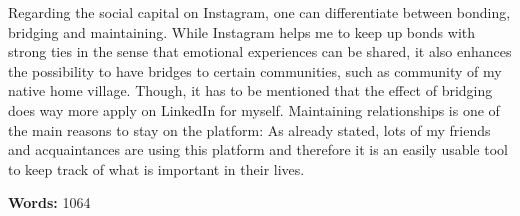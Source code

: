 \documentclass[11pt,letterpaper]{article}
\begin{document}
Regarding the social capital on Instagram, one can differentiate between bonding, bridging and maintaining. While Instagram helps me to keep up bonds with strong ties in the sense that emotional experiences can be shared, it also enhances the possibility to have bridges to certain communities, such as community of my native home village. Though, it has to be mentioned that the effect of bridging does way more apply on LinkedIn for myself. Maintaining relationships is one of the main reasons to stay on the platform: As already stated, lots of my friends and acquaintances are using this platform and therefore it is an easily usable tool to keep track of what is important in their lives. \newline


\noindent \textbf{Words:} 1064

\newpage

\printbibliography

\newpage
\end{document}
